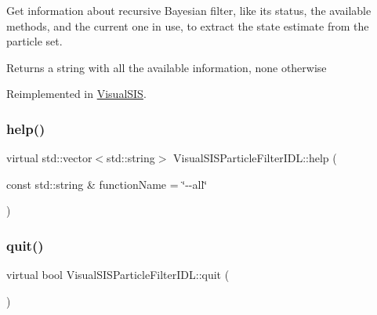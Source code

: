 Get information about recursive Bayesian filter, like it\textquotesingle{}s status, the available methods, and the current one in use, to extract the state estimate from the particle set. 

\begin{DoxyReturn}{Returns}
a string with all the available information, \textquotesingle{}none\textquotesingle{} otherwise 
\end{DoxyReturn}


Reimplemented in \hyperlink{classVisualSIS_af1ecb78ecc8c9838c05b7d29c5a9f83a}{Visual\+S\+IS}.

\mbox{\label{classVisualSISParticleFilterIDL_a3253f4dbc55e47183c04eb2e1054733c}} 
\subsubsection{\texorpdfstring{help()}{help()}}
{\footnotesize\ttfamily virtual std\+::vector$<$std\+::string$>$ Visual\+S\+I\+S\+Particle\+Filter\+I\+D\+L\+::help (\begin{DoxyParamCaption}\item[{const std\+::string \&}]{function\+Name = {\ttfamily \char`\"{}-\/-\/all\char`\"{}} }\end{DoxyParamCaption})\hspace{0.3cm}{\ttfamily [virtual]}}

\mbox{\label{classVisualSISParticleFilterIDL_a3f02a3df0d3dd545a6c62dc3a9f002b4}} 
\subsubsection{\texorpdfstring{quit()}{quit()}}
{\footnotesize\ttfamily virtual bool Visual\+S\+I\+S\+Particle\+Filter\+I\+D\+L\+::quit (\begin{DoxyParamCaption}{ }\end{DoxyParamCaption})\hspace{0.3cm}{\ttfamily [virtual]}}



